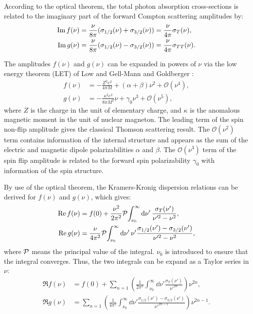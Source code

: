 According to the optical theorem, the total photon absorption cross-sections is related to the imaginary part of the forward Compton scattering amplitudes by:
\begin{equation} \label{C2S4E18}
\begin{split}
\Im f(\nu) & = \frac{\nu}{8\pi}(\sigma_{1/2}(\nu)+\sigma_{3/2}(\nu)) = \frac{\nu}{4\pi}\sigma_T(\nu), \\
\Im g(\nu) & = \frac{\nu}{8\pi}(\sigma_{1/2}(\nu)-\sigma_{3/2}(\nu)) = \frac{\nu}{4\pi}\sigma_{TT}(\nu).
\end{split}
\end{equation}

The amplitudes $f(\nu)$ and $g(\nu)$ can be expanded in powers of $\nu$ via the low energy theorem (LET) of Low \cite{Low1954} and Gell-Mann and Goldberger \cite{Gellmann1954b}:
\begin{align} \label{C2S4E19}
f(\nu) & = -\frac{Z^2e^2}{4\pi M}+(\alpha+\beta)\nu^2+\mathcal{O}(\nu^4), \\ \label{C2S4E20}
g(\nu) & = -\frac{\kappa^2e^2}{8\pi M^2}\nu+\gamma_0\nu^3+\mathcal{O}(\nu^5),
\end{align}
where $Z$ is the charge in the unit of elementary charge, and $\kappa$ is the anomalous magnetic moment in the unit of nuclear magneton. The leading term of the spin non-flip amplitude gives the classical Thomson scattering result. The $\mathcal{O}(\nu^2)$ term contains information of the internal structure and appears as the sum of the electric and magnetic dipole polarizabilities $\alpha$ and $\beta$. The $\mathcal{O}(\nu^3)$ term of the spin flip amplitude is related to the forward spin polarizability $\gamma_0$ with information of the spin structure.

By use of the optical theorem, the Kramers-Kronig dispersion relations can be derived for $f(\nu)$ and $g(\nu)$, which gives:
\begin{align} \label{C2S4E21}
\Re f(\nu) & = f(0)+\frac{\nu^2}{2\pi^2}\pv{\int_{\nu_0}^\infty\dd{\nu'}\frac{\sigma_T(\nu')}{\nu'^2-\nu^2}}, \\ \label{C2S4E22}
\Re g(\nu) & = \frac{\nu}{4\pi^2}\pv{\int_{\nu_0}^\infty\dd{\nu'}\nu'\frac{\sigma_{1/2}(\nu')-\sigma_{3/2}(\nu')}{\nu'^2-\nu^2}},
\end{align}
where $\pv$ means the principal value of the integral. $\nu_0$ is introduced to ensure that the integral converges. Thus, the two integrals can be expand as a Taylor series in $\nu$:
\begin{align} \label{C2S4E23}
\Re f(\nu) & = f(0)+\sum_{n=1}\left(\frac{1}{2\pi^2}\int_{\nu_0}^\infty\dd{\nu'}\frac{\sigma_T(\nu')}{\nu'^{2n}}\right)\nu^{2n}, \\ \label{C2S4E24}
\Re g(\nu) & = \sum_{n=1}\left(\frac{1}{4\pi^2}\int_{\nu_0}^\infty\dd{\nu'}\frac{\sigma_{1/2}(\nu')-\sigma_{3/2}(\nu')}{\nu'^{2n-1}}\right)\nu^{2n-1}.
\end{align}

